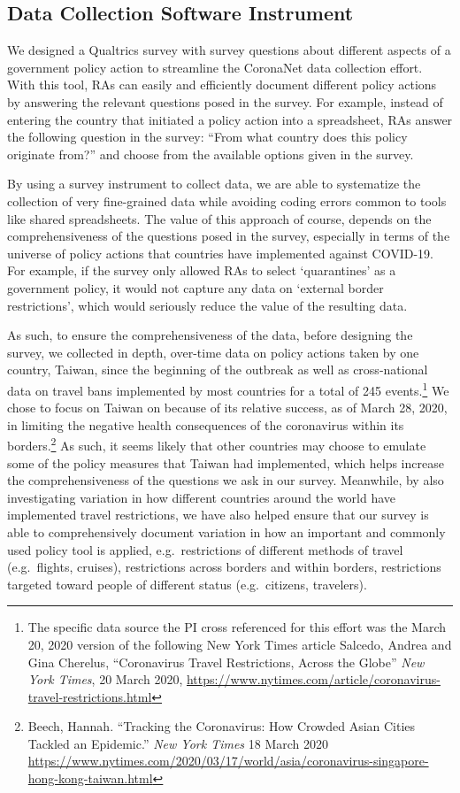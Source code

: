 \documentclass[]{article}
\let\rmarkdownfootnote\footnote%
\def\footnote{\protect\rmarkdownfootnote}
\begin{document}
\hypertarget{data-collection-software-instrument}{%
\subsection{Data Collection Software Instrument}\label{data-collection-software-instrument}}

We designed a Qualtrics survey with survey questions about different aspects of a government policy action to streamline the CoronaNet data collection effort. With this tool, RAs can easily and efficiently document different policy actions by answering the relevant questions posed in the survey. For example, instead of entering the country that initiated a policy action into a spreadsheet, RAs answer the following question in the survey: ``From what country does this policy originate from?'' and choose from the available options given in the survey.

By using a survey instrument to collect data, we are able to systematize the collection of very fine-grained data while avoiding coding errors common to tools like shared spreadsheets. The value of this approach of course, depends on the comprehensiveness of the questions posed in the survey, especially in terms of the universe of policy actions that countries have implemented against COVID-19. For example, if the survey only allowed RAs to select `quarantines' as a government policy, it would not capture any data on `external border restrictions', which would seriously reduce the value of the resulting data.

As such, to ensure the comprehensiveness of the data, before designing the survey, we collected in depth, over-time data on policy actions taken by one country, Taiwan, since the beginning of the outbreak as well as cross-national data on travel bans implemented by most countries for a total of 245 events.\footnote{The specific data source the PI cross referenced for this effort was the March 20, 2020 version of the following New York Times article Salcedo, Andrea and Gina Cherelus, ``Coronavirus Travel Restrictions, Across the Globe'' \emph{New York Times}, 20 March 2020, \url{https://www.nytimes.com/article/coronavirus-travel-restrictions.html}} We chose to focus on Taiwan on because of its relative success, as of March 28, 2020, in limiting the negative health consequences of the coronavirus within its borders.\footnote{Beech, Hannah. ``Tracking the Coronavirus: How Crowded Asian Cities Tackled an Epidemic.'' \emph{New York Times} 18 March 2020 \url{https://www.nytimes.com/2020/03/17/world/asia/coronavirus-singapore-hong-kong-taiwan.html}} As such, it seems likely that other countries may choose to emulate some of the policy measures that Taiwan had implemented, which helps increase the comprehensiveness of the questions we ask in our survey. Meanwhile, by also investigating variation in how different countries around the world have implemented travel restrictions, we have also helped ensure that our survey is able to comprehensively document variation in how an important and commonly used policy tool is applied, e.g.~restrictions of different methods of travel (e.g.~flights, cruises), restrictions across borders and within borders, restrictions targeted toward people of different status (e.g.~citizens, travelers).
\end{document}
